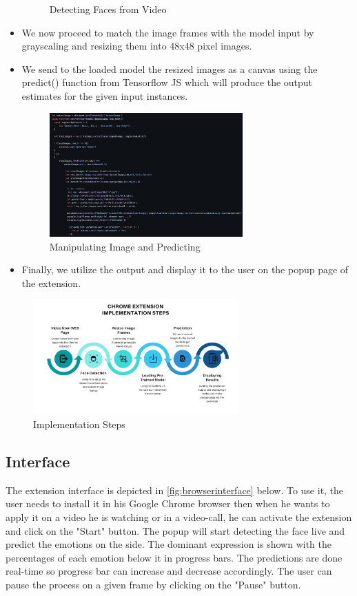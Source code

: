 \documentclass[12pt,a4paper,oneside,english]{book}
\begin{document}
\begin{itemize}
\begin{figure}[H]
    \caption{Detecting Faces from Video}
    \label{fig:facedetection}
\end{figure}
\item We now proceed to match the image frames with the model input by grayscaling and resizing them into 48x48 pixel images.
\item We send to the loaded model the resized images as a canvas using the predict() function from Tensorflow JS which will produce the output estimates for the given input instances.
\begin{figure}[H]
    \centering
    \includegraphics[width=0.7\textwidth]{figures/Resize&predict.png}
    \caption{Manipulating Image and Predicting}
    \label{fig:resizingandpredicting}
\end{figure}
\item Finally, we utilize the output and display it to the user on the popup page of the extension.
\end{itemize}
\begin{figure}[H]
    \centering
    \includegraphics[width=0.7\textwidth]{figures/steps.png}
    \caption{Implementation Steps}
    \label{fig:implementationsteps}
\end{figure}
\subsection{Interface}
The extension interface is depicted in \autoref{fig:browserinterface} below. To use it, the user needs to install it in his Google Chrome browser then when he wants to apply it on a video he is watching or in a video-call, he can activate the extension and click on the "Start" button.
The popup will start detecting the face live and predict the emotions on the side. The dominant expression is shown with the percentages of each emotion below it in progress bars. The predictions are done real-time so progress bar can increase and decrease accordingly. The user can pause the process on a given frame by clicking on the "Pause" button.
\end{document}
